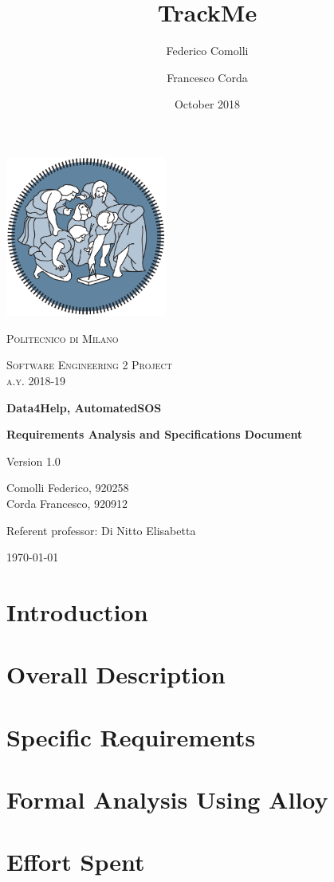 \documentclass{report}
\title{TrackMe}
\author{Federico Comolli
        \and
        Francesco Corda}
\date{October 2018}
\begin{document}
\begin{titlepage}
	\centering
	\includegraphics[width=150pt]{images/polimi_logo}\par\vspace{1cm}
	{\scshape\LARGE
		Politecnico di Milano\par}
	\vspace{1cm}
	{\scshape\Large
		Software Engineering 2 Project\\
		a.y. 2018-19\par}
	\vspace{1.5cm}
	{\huge\bfseries
		Data4Help, AutomatedSOS\\\par}
	{\Large\bfseries
		Requirements Analysis and Specifications Document\par}
	Version 1.0\par
	\vspace{2cm}
	{\Large
		Comolli Federico, 920258\\
	    Corda Francesco, 920912\par}
	\vfill
	Referent professor: Di Nitto Elisabetta\par
	\vfill
	{\large\today\par}
\end{titlepage}

\renewcommand{\contentsname}{Table of Contents}
\tableofcontents


\chapter{Introduction}


\chapter{Overall Description}


\chapter{Specific Requirements}
\cite{adams1995hitchhiker}


\chapter{Formal Analysis Using Alloy}


\chapter{Effort Spent}
 



\end{document}
